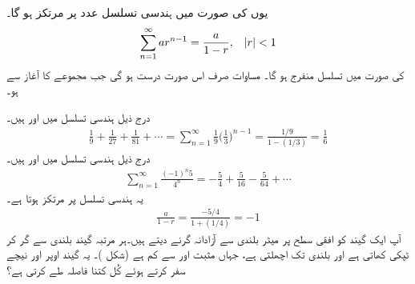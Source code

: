 یوں  کی صورت میں ہندسی تسلسل  عدد  پر مرتکز ہو گا۔
\begin{align}\label{مساوات_تسلسل_مجموعہ_ہندسی_تسلسل}
\sum_{n=1}^{\infty}ar^{n-1}=\frac{a}{1-r},\quad \abs{r}<1
\end{align}
 کی صورت میں تسلسل منفرج ہو گا۔ مساوات  صرف اس صورت درست ہو گی  جب مجموعے کا آغاز  سے  ہو۔

درج ذیل ہندسی تسلسل میں  اور  ہیں۔
\begin{align*}
\frac{1}{9}+\frac{1}{27}+\frac{1}{81}+\cdots=\sum_{n=1}^{\infty}\frac{1}{9}\big(\frac{1}{3}\big)^{n-1}=\frac{1/9}{1-(1/3)}=\frac{1}{6}
\end{align*}
درج ذیل ہندسی تسلسل میں  اور  ہیں۔
\begin{align*}
\sum_{n=1}^{\infty}\frac{(-1)^n5}{4^n}=-\frac{5}{4}+\frac{5}{16}-\frac{5}{64}+\cdots
\end{align*}
یہ ہندسی تسلسل  پر مرتکز ہوتا  ہے۔
\begin{align*}
\frac{a}{1-r}=\frac{-5/4}{1+(1/4)}=-1
\end{align*}
آپ ایک گیند کو افقی سطح پر  میٹر بلندی سے آزادانہ گرنے دیتے ہیں۔ہر مرتبہ   گیند  بلندی سے گر کر  ٹپکی کھاتی ہے اور  بلندی تک اچھلتی   ہے،  جہاں  مثبت اور  سے کم ہے (شکل )۔ یہ گیند اوپر اور نیچے سفر کرتے ہوئے کُل کتنا فاصلہ طے کرتی ہے؟

